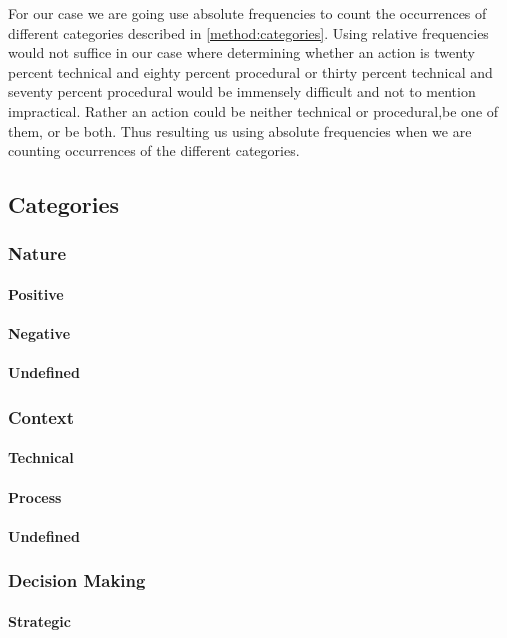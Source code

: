 For our case we are going use absolute frequencies to count the occurrences of different categories described in \autoref{method:categories}. Using relative frequencies would not suffice in our case where determining whether an action is twenty percent technical and eighty percent procedural or thirty percent technical and seventy percent procedural would be immensely difficult and not to mention impractical. Rather an action could be neither technical or procedural,be one of them, or be both. Thus resulting us using absolute frequencies when we are counting occurrences of the different categories.

\subsection{Categories}\label{method:categories}
\subsubsection{Nature}
\paragraph{Positive}
\paragraph{Negative}
\paragraph{Undefined}
\subsubsection{Context}
\paragraph{Technical}
\paragraph{Process}
\paragraph{Undefined}
\subsubsection{Decision Making}
\paragraph{Strategic}

